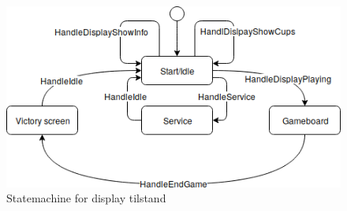 \documentclass[Rapport/Rapport_main.tex]{subfiles}
\begin{document}
\begin{figure}[H]
    \centering
    \includegraphics[scale=0.8]{Softwaredesign/GUI/Pictures/Gui_displaystatemachine.png}
    \caption{Statemachine for display tilstand}
    \label{GuiDisplayStatemachine}
\end{figure}

\end{document}

